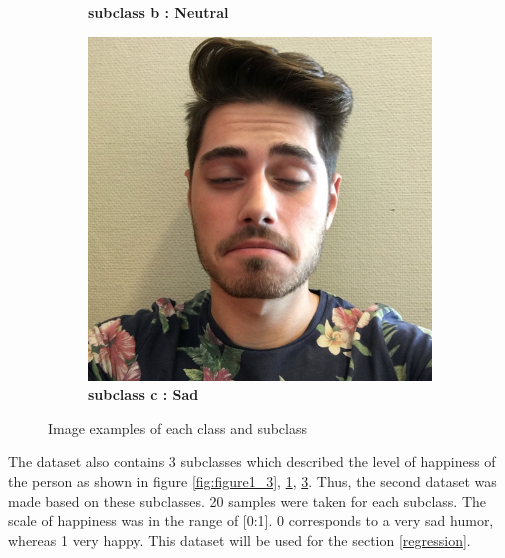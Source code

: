 \begin{figure}[!hp]
\begin{subfigure}[h]{0.30\textwidth}
	\caption{\bf subclass b : Neutral}
    \label{fig:figure1_4}
    \end{subfigure}
    \begin{subfigure}[h]{0.30\textwidth}
    \centering
    \includegraphics[height=0.12\textheight]{dataset/IMG_1452.jpg}
	\caption{\bf subclass c : Sad}
    \label{fig:figure1_5}
    \end{subfigure}
\caption{Image examples of each class and subclass}
\end{figure}
    The dataset also contains 3 subclasses which described the level of happiness of the person as shown in figure \ref{fig:figure1_3}, \ref{fig:figure1_4}, \ref{fig:figure1_5}. Thus, the second dataset was made based on these subclasses. 20 samples were taken for each subclass. The scale of happiness was in the range of [0:1]. 0 corresponds to a very sad humor, whereas 1 very happy. This dataset will be used for the section \ref{regression}.
    


